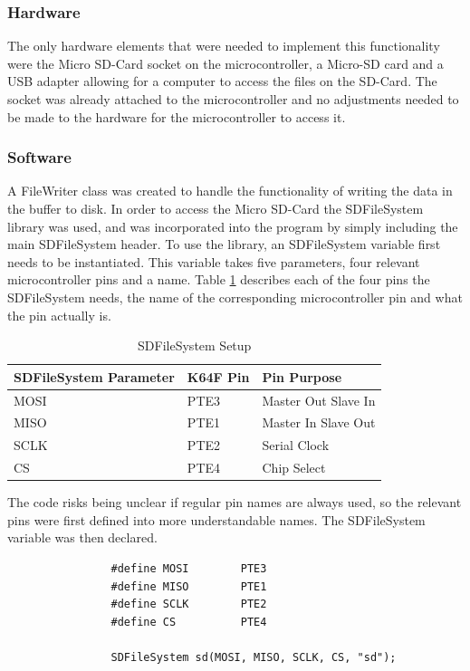 				\subsubsection{Hardware}
				The only hardware elements that were needed to implement this functionality were the Micro SD-Card socket on the microcontroller, a Micro-SD card and a USB adapter allowing for a computer to access the files on the SD-Card. The socket was already attached to the microcontroller and no adjustments needed to be made to the hardware for the microcontroller to access it.
				
				\subsubsection{Software}
				A FileWriter class was created to handle the functionality of writing the data in the buffer to disk. In order to access the Micro SD-Card the SDFileSystem library was used, and was incorporated into the program by simply including the main SDFileSystem header. To use the library, an SDFileSystem variable first needs to be instantiated. This variable takes five parameters, four relevant microcontroller pins and a name. Table \ref{table:sdfilesystempins} describes each of the four pins the SDFileSystem needs, the name of the corresponding microcontroller pin and what the pin actually is.
	
				\begin{table}[h!]
					\centering
					\begin{tabular}{|| l | l | l ||} 
						\hline
						SDFileSystem Parameter & K64F Pin & Pin Purpose \\ [0.5ex] 
						\hline
						MOSI  & PTE3 & Master Out Slave In \\ 
						MISO  & PTE1  & Master In Slave Out \\
						SCLK  & PTE2 & Serial Clock \\
						CS & PTE4 & Chip Select \\ [1ex] 
						\hline
					\end{tabular}
					\caption{SDFileSystem Setup}
					\label{table:sdfilesystempins}
				\end{table}
			
				The code risks being unclear if regular pin names are always used, so the relevant pins were first defined into more understandable names. The SDFileSystem variable was then declared.
				
				\begin{lstlisting}
				#define MOSI		PTE3
				#define MISO		PTE1
				#define	SCLK		PTE2
				#define	CS			PTE4
				
				SDFileSystem sd(MOSI, MISO, SCLK, CS, "sd");
				\end{lstlisting}
				
